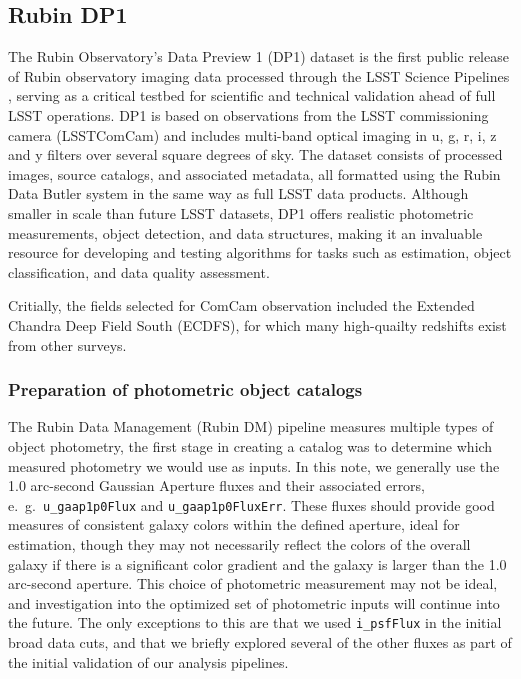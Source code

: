\subsection{Rubin DP1}
\label{sec:data:dp1}

The Rubin Observatory’s Data Preview 1 (DP1) dataset is the first public release of Rubin observatory imaging data processed through the LSST Science Pipelines \cite{PSTN-019}, serving as a critical testbed for scientific and technical validation ahead of full LSST operations.  DP1 is based on observations from the LSST commissioning camera (LSSTComCam) and includes multi-band optical imaging in u, g, r, i, z and y filters over several square degrees of sky.  The dataset consists of processed images, source catalogs, and associated metadata, all formatted using the Rubin Data Butler system \citep{2022SPIE12189E..11J} in the same way as full LSST data products.  Although smaller in scale than future LSST datasets, DP1 offers realistic photometric measurements, object detection, and data structures, making it an invaluable resource for developing and testing algorithms for tasks such as \photoz estimation, object classification, and data quality assessment.

Critially, the fields selected for ComCam observation included the Extended Chandra Deep Field South (ECDFS), for which many high-quailty redshifts exist from other surveys. 


\subsubsection{Preparation of photometric object catalogs}
\label{sec:data:dp1:preparation}

The Rubin Data Management (Rubin DM) pipeline measures multiple types of object photometry, the first stage in creating a \photoz catalog was to determine which measured photometry we would use as inputs.  In this note, we generally use the 1.0 arc-second Gaussian Aperture fluxes and their associated errors, e.~g.~\texttt{u\_gaap1p0Flux} and \texttt{u\_gaap1p0FluxErr}.  These fluxes should provide good measures of consistent galaxy colors within the defined aperture, ideal for \photoz estimation, though they may not necessarily reflect the colors of the overall galaxy if there is a significant color gradient and the galaxy is larger than the 1.0 arc-second aperture.  This choice of photometric measurement may not be ideal, and investigation into the optimized set of photometric inputs will continue into the future.   The only exceptions to this are that we used \texttt{i\_psfFlux} in the initial broad data cuts, and that we briefly explored several of the other fluxes as part of the initial validation of our \photoz analysis pipelines. 

